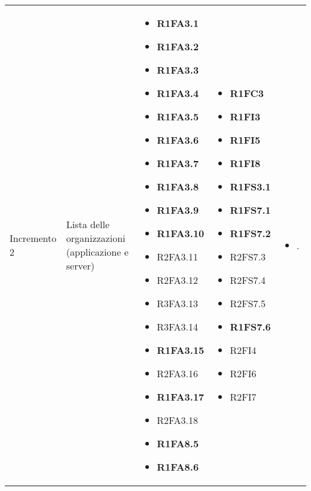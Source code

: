 {\begin{longtable}{C{2.5cm} C{3.2cm} C{2.8cm} C{2.8cm} C{2.8cm}}
Incremento 2 & Lista delle organizzazioni (applicazione e server) & \begin{itemize}
    \item[ ] \textbf{R1FA3.1}
    \item[ ] \textbf{R1FA3.2}
    \item[ ] \textbf{R1FA3.3}
    \item[ ] \textbf{R1FA3.4}
    \item[ ] \textbf{R1FA3.5}
    \item[ ] \textbf{R1FA3.6}
    \item[ ] \textbf{R1FA3.7}
    \item[ ] \textbf{R1FA3.8}
    \item[ ] \textbf{R1FA3.9}
    \item[ ] \textbf{R1FA3.10}
    \item[ ] R2FA3.11
    \item[ ] R2FA3.12
    \item[ ] R3FA3.13
    \item[ ] R3FA3.14
    \item[ ] \textbf{R1FA3.15}
    \item[ ] R2FA3.16
    \item[ ] \textbf{R1FA3.17}
    \item[ ] R2FA3.18 
    \item[ ] \textbf{R1FA8.5}
    \item[ ] \textbf{R1FA8.6}
\end{itemize} & \begin{itemize} 
    \item[ ] \textbf{R1FC3}
    \item[ ] \textbf{R1FI3}
    \item[ ] \textbf{R1FI5}
    \item[ ] \textbf{R1FI8}
    \item[ ] \textbf{R1FS3.1}
    \item[ ] \textbf{R1FS7.1}
    \item[ ] \textbf{R1FS7.2}
    \item[ ] R2FS7.3
    \item[ ] R2FS7.4
    \item[ ] R2FS7.5 
    \item[ ] \textbf{R1FS7.6}
    \item[ ] R2FI4
    \item[ ] R2FI6
    \item[ ] R2FI7
\end{itemize} & \begin{itemize} 
    \item[ ] .
\end{itemize}\\


\end{longtable}}
